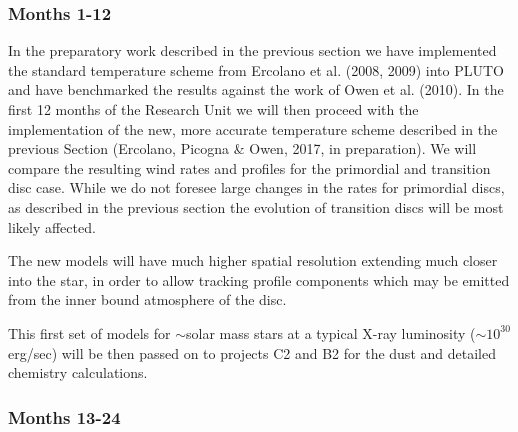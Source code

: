 \documentclass[10pt,fleqn,twoside]{article}
\makeatletter
\renewcommand\paragraph{\@startsection{paragraph}{4}{\z@}%
            {-2.5ex\@plus -1ex \@minus -.25ex}%
            {1.25ex \@plus .25ex}%
            {\normalfont\normalsize\bfseries}}
\makeatother
\begin{document}





\subsubsection{Months 1-12}
In the preparatory work described in the previous section we have
implemented the standard temperature scheme from Ercolano et
al. (2008, 2009) into PLUTO and have benchmarked the results against
the work of Owen et al. (2010). In the first 12 months of the Research
Unit we will then proceed with the implementation of the new, more accurate
temperature scheme described in the previous Section (Ercolano,
Picogna \& Owen, 2017, in preparation). We will compare the resulting
wind rates and profiles for the primordial and transition disc
case. While we do not foresee large changes in the rates for
primordial discs, as described in the previous section the evolution of transition discs will be most
likely affected. 

The new models will have much higher spatial
resolution extending much closer into the star, in order to allow
tracking profile components which may be emitted from the inner bound
atmosphere of the disc. 

This first set of models for $\sim$solar mass stars at a typical X-ray
luminosity ($\sim 10^{30}$erg/sec) will be then passed on to projects
C2 and B2 for the dust and detailed chemistry calculations. 

\subsubsection{Months 13-24}
\end{document}
